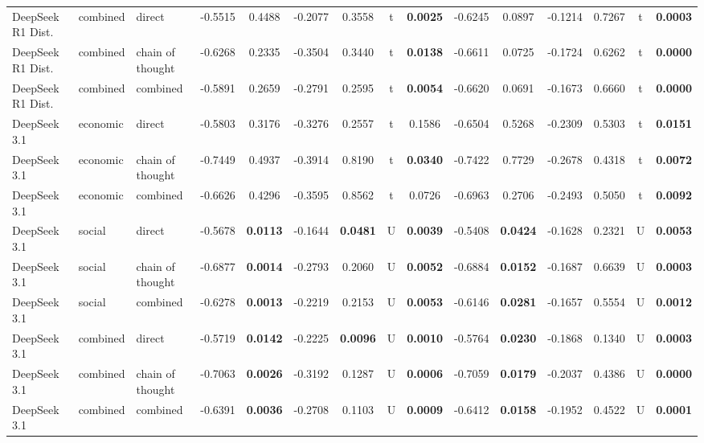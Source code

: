 \begin{center}
\begin{longtable}{@{}lll|cccccc|cccccc@{}}
        DeepSeek R1 Dist. & combined & direct & -0.5515 & 0.4488 & -0.2077 & 0.3558 & t & \textbf{0.0025} & -0.6245 & 0.0897 & -0.1214 & 0.7267 & t & \textbf{0.0003} \\
        DeepSeek R1 Dist. & combined & chain of thought & -0.6268 & 0.2335 & -0.3504 & 0.3440 & t & \textbf{0.0138} & -0.6611 & 0.0725 & -0.1724 & 0.6262 & t & \textbf{0.0000} \\
        \rowcolor{gray!20} DeepSeek R1 Dist. & combined & combined & -0.5891 & 0.2659 & -0.2791 & 0.2595 & t & \textbf{0.0054} & -0.6620 & 0.0691 & -0.1673 & 0.6660 & t & \textbf{0.0000} \\
        DeepSeek 3.1 & economic & direct & -0.5803 & 0.3176 & -0.3276 & 0.2557 & t & 0.1586 & -0.6504 & 0.5268 & -0.2309 & 0.5303 & t & \textbf{0.0151} \\
        DeepSeek 3.1 & economic & chain of thought & -0.7449 & 0.4937 & -0.3914 & 0.8190 & t & \textbf{0.0340} & -0.7422 & 0.7729 & -0.2678 & 0.4318 & t & \textbf{0.0072} \\
        DeepSeek 3.1 & economic & combined & -0.6626 & 0.4296 & -0.3595 & 0.8562 & t & 0.0726 & -0.6963 & 0.2706 & -0.2493 & 0.5050 & t & \textbf{0.0092} \\
        DeepSeek 3.1 & social & direct & -0.5678 & \textbf{0.0113} & -0.1644 & \textbf{0.0481} & U & \textbf{0.0039} & -0.5408 & \textbf{0.0424} & -0.1628 & 0.2321 & U & \textbf{0.0053} \\
        DeepSeek 3.1 & social & chain of thought & -0.6877 & \textbf{0.0014} & -0.2793 & 0.2060 & U & \textbf{0.0052} & -0.6884 & \textbf{0.0152} & -0.1687 & 0.6639 & U & \textbf{0.0003} \\
        DeepSeek 3.1 & social & combined & -0.6278 & \textbf{0.0013} & -0.2219 & 0.2153 & U & \textbf{0.0053} & -0.6146 & \textbf{0.0281} & -0.1657 & 0.5554 & U & \textbf{0.0012} \\
        DeepSeek 3.1 & combined & direct & -0.5719 & \textbf{0.0142} & -0.2225 & \textbf{0.0096} & U & \textbf{0.0010} & -0.5764 & \textbf{0.0230} & -0.1868 & 0.1340 & U & \textbf{0.0003} \\
        DeepSeek 3.1 & combined & chain of thought & -0.7063 & \textbf{0.0026} & -0.3192 & 0.1287 & U & \textbf{0.0006} & -0.7059 & \textbf{0.0179} & -0.2037 & 0.4386 & U & \textbf{0.0000} \\
        \rowcolor{gray!20} DeepSeek 3.1 & combined & combined & -0.6391 & \textbf{0.0036} & -0.2708 & 0.1103 & U & \textbf{0.0009} & -0.6412 & \textbf{0.0158} & -0.1952 & 0.4522 & U & \textbf{0.0001} \\

\end{longtable}
\end{center}
